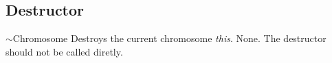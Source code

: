 \subsection{Destructor}

\printEmptyMethodReturnSpecial
{}
{$\sim$Chromosome}
{Destroys the current chromosome {\em this}.}
{None.}
{The destructor should not be called diretly.}
